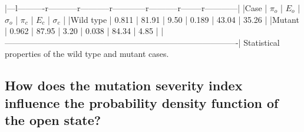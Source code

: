 |---l----------r-----------r-----------r------------r-----------r--------r------------|
|Case      | $\pi_{o}$ | $E_{o}$ | $\sigma_{o}$ | $\pi_{c}$ | $E_{c}$ | $\sigma_{c}$  |
|Wild type | 0.811     | 81.91   | 9.50         | 0.189     | 43.04   | 35.26         |
|Mutant    | 0.962     | 87.95   | 3.20         | 0.038     | 84.34   | 4.85          |
|-------------------------------------------------------------------------------------|
Statistical properties of the wild type and mutant cases.
\label{stat1D}




\subsection{How does the mutation severity index influence the probability
density function of the open state?}

